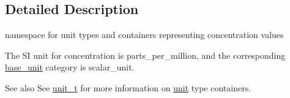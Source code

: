 \subsection{Detailed Description}
namespace for unit types and containers representing concentration values 

The S\+I unit for concentration is {\ttfamily parts\+\_\+per\+\_\+million}, and the corresponding {\ttfamily \hyperlink{structunits_1_1base__unit}{base\+\_\+unit}} category is {\ttfamily scalar\+\_\+unit}. \begin{DoxySeeAlso}{See also}
See \hyperlink{classunits_1_1unit__t}{unit\+\_\+t} for more information on \hyperlink{structunits_1_1unit}{unit} type containers. 
\end{DoxySeeAlso}
